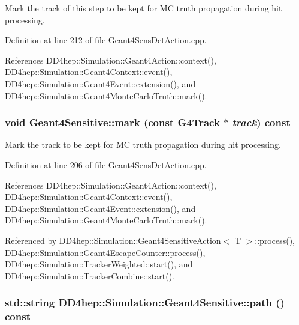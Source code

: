 Mark the track of this step to be kept for MC truth propagation during hit processing. 

Definition at line 212 of file Geant4SensDetAction.cpp.

References DD4hep::Simulation::Geant4Action::context(), DD4hep::Simulation::Geant4Context::event(), DD4hep::Simulation::Geant4Event::extension(), and DD4hep::Simulation::Geant4MonteCarloTruth::mark().\hypertarget{class_d_d4hep_1_1_simulation_1_1_geant4_sensitive_ab5c51f863ef61aa15b89fd88f6709e70}{
\subsubsection[{mark}]{\setlength{\rightskip}{0pt plus 5cm}void Geant4Sensitive::mark (const G4Track $\ast$ {\em track}) const}}
\label{class_d_d4hep_1_1_simulation_1_1_geant4_sensitive_ab5c51f863ef61aa15b89fd88f6709e70}


Mark the track to be kept for MC truth propagation during hit processing. 

Definition at line 206 of file Geant4SensDetAction.cpp.

References DD4hep::Simulation::Geant4Action::context(), DD4hep::Simulation::Geant4Context::event(), DD4hep::Simulation::Geant4Event::extension(), and DD4hep::Simulation::Geant4MonteCarloTruth::mark().

Referenced by DD4hep::Simulation::Geant4SensitiveAction$<$ T $>$::process(), DD4hep::Simulation::Geant4EscapeCounter::process(), DD4hep::Simulation::TrackerWeighted::start(), and DD4hep::Simulation::TrackerCombine::start().\hypertarget{class_d_d4hep_1_1_simulation_1_1_geant4_sensitive_af0dd51ffd093c81452258d43f064fe49}{
\subsubsection[{path}]{\setlength{\rightskip}{0pt plus 5cm}std::string DD4hep::Simulation::Geant4Sensitive::path () const}}
\label{class_d_d4hep_1_1_simulation_1_1_geant4_sensitive_af0dd51ffd093c81452258d43f064fe49}


